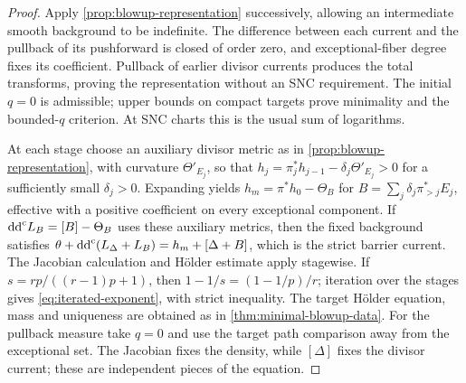 \begin{proof}
Apply \cref{prop:blowup-representation} successively, allowing an intermediate smooth background to be indefinite. The difference between each current and the pullback of its pushforward is closed of order zero, and exceptional-fiber degree fixes its coefficient. Pullback of earlier divisor currents produces the total transforms, proving the representation without an SNC requirement. The initial $q=0$ is admissible; upper bounds on compact targets prove minimality and the bounded-$q$ criterion. At SNC charts this is the usual sum of logarithms.

At each stage choose an auxiliary divisor metric as in \cref{prop:blowup-representation}, with curvature $\Theta'_{E_j}$, so that $h_j=\pi_j^*h_{j-1}-\delta_j\Theta'_{E_j}>0$ for a sufficiently small $\delta_j>0$. Expanding yields $h_m=\pi^*h_0-\Theta_B$ for $B=\sum_j\delta_j\pi_{>j}^*E_j$, effective with a positive coefficient on every exceptional component. If $\mathrm{dd}^{\mathrm{c}} L_B=[B]-\Theta_B$ uses these auxiliary metrics, then the fixed background satisfies $\theta+\mathrm{dd}^{\mathrm{c}}(L_\Delta+L_B)=h_m+[\Delta+B]$, which is the strict barrier current. The Jacobian calculation and H\"older estimate apply stagewise. If $s=rp/((r-1)p+1)$, then $1-1/s=(1-1/p)/r$; iteration over the stages gives \eqref{eq:iterated-exponent}, with strict inequality. The target H\"older equation, mass and uniqueness are obtained as in \cref{thm:minimal-blowup-data}. For the pullback measure take $q=0$ and use the target path comparison away from the exceptional set. The Jacobian fixes the density, while $[\Delta]$ fixes the divisor current; these are independent pieces of the equation.
\end{proof}
